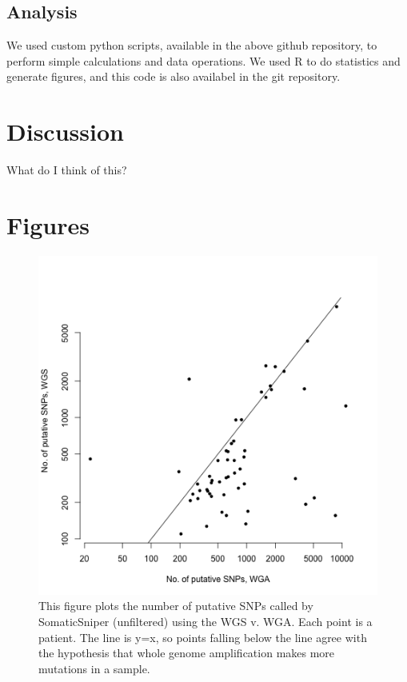 \documentclass[11pt]{article} %
\begin{document}
\subsection{Analysis}

We used custom python scripts, available in the above github repository, to perform simple calculations and data operations. We used R to do statistics and generate figures, and this code is also availabel in the git repository.  

\section{Discussion}

What do I think of this?

\section{Figures}

\begin{figure}
\includegraphics[scale=1.0]{C282_v_C484.png}
\caption{This figure plots the number of putative SNPs called by SomaticSniper (unfiltered) using the WGS v. WGA. Each point is a patient. The line is y=x, so points falling below the line agree with the hypothesis that whole genome amplification makes more mutations in a sample.}
\end{figure}
\end{document}
